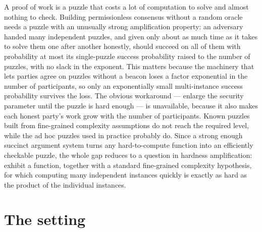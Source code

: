 \documentclass{aicr-conjecture}
\begin{document}

\vspace{0.4em}

\begin{informalconjecture}
A proof of work is a puzzle that costs a lot of computation to solve and almost nothing to check. Building permissionless consensus without a random oracle needs a puzzle with an unusually strong amplification property: an adversary handed many independent puzzles, and given only about as much time as it takes to solve them one after another honestly, should succeed on all of them with probability at most its single-puzzle success probability raised to the number of puzzles, with no slack in the exponent. This matters because the machinery that lets parties agree on puzzles without a beacon loses a factor exponential in the number of participants, so only an exponentially small multi-instance success probability survives the loss. The obvious workaround --- enlarge the security parameter until the puzzle is hard enough --- is unavailable, because it also makes each honest party's work grow with the number of participants. Known puzzles built from fine-grained complexity assumptions do not reach the required level, while the ad hoc puzzles used in practice probably do. Since a strong enough succinct argument system turns any hard-to-compute function into an efficiently checkable puzzle, the whole gap reduces to a question in hardness amplification: exhibit a function, together with a standard fine-grained complexity hypothesis, for which computing many independent instances quickly is exactly as hard as the product of the individual instances.
\end{informalconjecture}

\section{The setting}\label{sec:setting}
\end{document}
